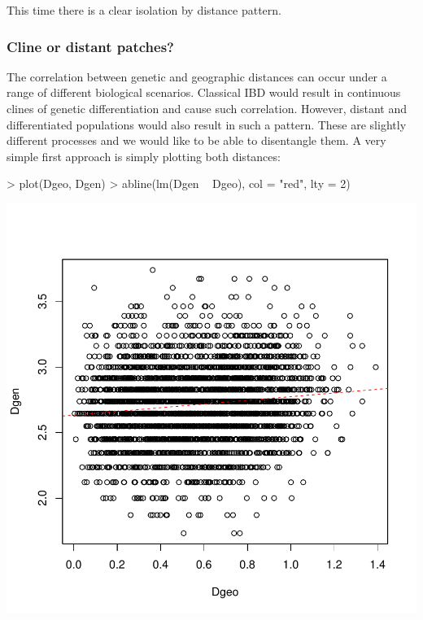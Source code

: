 \documentclass{article}
\begin{document}
\noindent This time there is a clear isolation by distance pattern.


\subsubsection{Cline or distant patches?}
The correlation between genetic and geographic distances can occur under a range of different
biological scenarios.
Classical IBD would result in continuous clines of genetic differentiation and cause such correlation.
However, distant and differentiated populations would also result in such a pattern.
These are slightly different processes and we would like to be able to disentangle them.
A very simple first approach is simply plotting both distances:
\begin{Schunk}
\begin{Sinput}
> plot(Dgeo, Dgen)
> abline(lm(Dgen ~ Dgeo), col = "red", lty = 2)
\end{Sinput}
\end{Schunk}
\includegraphics{figs/base-088}
\end{document}
